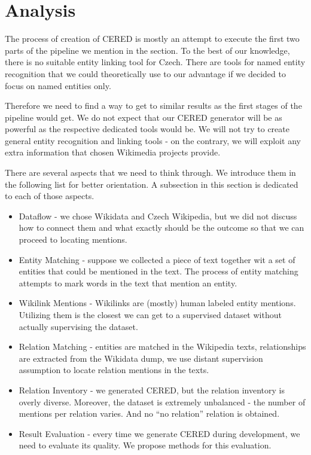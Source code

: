 \section{Analysis}
\label{text:Analysis}
The process of creation of CERED is mostly an attempt to execute the first two parts of the pipeline we mention in the 
 section. To the best of our knowledge, there is no suitable entity linking tool for Czech. There are tools for named entity recognition that we could theoretically use to our advantage if we decided to focus on named entities only.

Therefore we need to find a way to get to similar results as the first stages of the pipeline would get. We do not expect that our CERED generator will be as powerful as the respective dedicated tools would be. We will not try to create general entity recognition and linking tools - on the contrary, we will exploit any extra information that chosen Wikimedia projects provide.

There are several aspects that we need to think through. We introduce them in the following list for better orientation. A subsection in this section is dedicated to each of those aspects. 
\begin{itemize}
 \item  Dataflow - we chose Wikidata and Czech Wikipedia, but we did not discuss how to connect them and what exactly should be the outcome so that we can proceed to locating mentions.
 \item  Entity Matching - suppose we collected a piece of text together wit a set of entities that could be mentioned in the text. The process of entity matching attempts to mark words in the text that mention an entity.
 \item  Wikilink Mentions - Wikilinks are (mostly) human labeled entity mentions. Utilizing them is the closest we can get to a supervised dataset without actually supervising the dataset.
 \item  Relation Matching - entities are matched in the Wikipedia texts, relationships are extracted from the Wikidata dump, we use distant supervision assumption to locate relation mentions in the texts.
\item Relation Inventory - we generated CERED, but the relation inventory is overly diverse. Moreover, the dataset is extremely unbalanced - the number of mentions per relation varies. And no “no relation” relation is obtained.
 \item  Result Evaluation - every time we generate CERED during development, we need to evaluate its quality. We propose methods for this evaluation. 
\end{itemize}




